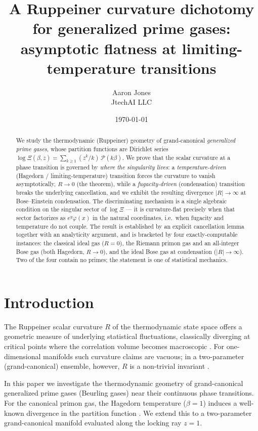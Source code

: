 \documentclass[a4paper,11pt]{article}
\title{A Ruppeiner curvature dichotomy for generalized prime gases:\\
       asymptotic flatness at limiting-temperature transitions}
\author{Aaron Jones\\ \small JtechAI LLC}
\date{\today}
\theoremstyle{plain}
\theoremstyle{definition}
\theoremstyle{remark}
\newcommand{\Ric}{R}
\begin{document}
\maketitle

\begin{abstract}
We study the thermodynamic (Ruppeiner) geometry of grand-canonical \emph{generalized prime gases},
whose partition functions are Dirichlet series $\log\Xi(\beta,z)=\sum_{k\ge1}(z^k/k)\,\mathcal P(k\beta)$.
We prove that the scalar curvature at a phase transition is governed by \emph{where the singularity
lives}: a \emph{temperature-driven} (Hagedorn / limiting-temperature) transition forces the curvature
to vanish asymptotically, $\Ric\to0$ (the theorem), while a \emph{fugacity-driven} (condensation) transition
breaks the underlying cancellation, and we exhibit the resulting divergence $|\Ric|\to\infty$ at
Bose--Einstein condensation. The discriminating mechanism is a single algebraic condition on the
singular sector of $\log\Xi$ --- it is curvature-flat precisely when that sector factorizes as
$e^{y}\varphi(x)$ in the natural coordinates, i.e.\ when fugacity and temperature do not couple. The
result is established by an explicit cancellation lemma together with an analyticity argument, and is
bracketed by four exactly-computable instances: the classical ideal gas ($\Ric=0$), the Riemann
primon gas and an all-integer Bose gas (both Hagedorn, $\Ric\to0$), and the ideal Bose gas at
condensation ($|\Ric|\to\infty$). Two of the four contain no primes; the statement is one of
statistical mechanics.
\end{abstract}

\section{Introduction}\label{sec:intro}
The Ruppeiner scalar curvature $R$ of the thermodynamic state space offers a geometric measure of
underlying statistical fluctuations, classically diverging at critical points where the correlation
volume becomes macroscopic \cite{ruppeiner1995}. For one-dimensional manifolds such curvature claims
are vacuous; in a two-parameter (grand-canonical) ensemble, however, $R$ is a non-trivial invariant
\cite{ruppeiner1995,janyszek1990}.

In this paper we investigate the thermodynamic geometry of grand-canonical generalized prime gases
(Beurling gases) near their continuous phase transitions. For the canonical primon gas, the Hagedorn
temperature ($\beta=1$) induces a well-known divergence in the partition function
\cite{julia1990,julia1994,spector1990,bakas1991}. We extend this to a two-parameter grand-canonical
manifold evaluated along the locking ray $z=1$.
\end{document}
